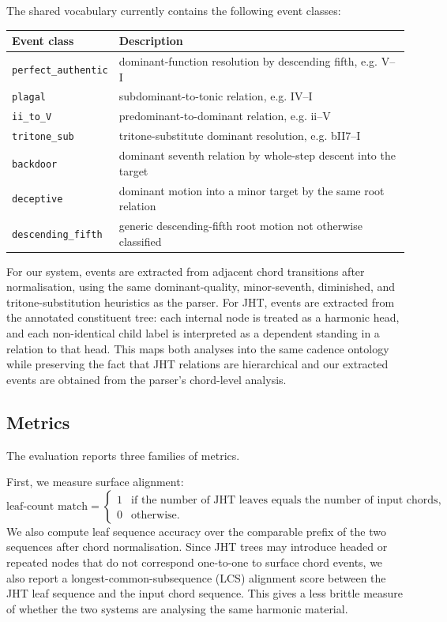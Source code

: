 The shared vocabulary currently contains the following event classes:

\begin{center}
\begin{tabular}{ll}
\hline
Event class & Description \\
\hline
\texttt{perfect\_authentic} & dominant-function resolution by descending fifth, e.g. V--I \\
\texttt{plagal} & subdominant-to-tonic relation, e.g. IV--I \\
\texttt{ii\_to\_V} & predominant-to-dominant relation, e.g. ii--V \\
\texttt{tritone\_sub} & tritone-substitute dominant resolution, e.g. bII7--I \\
\texttt{backdoor} & dominant seventh relation by whole-step descent into the target \\
\texttt{deceptive} & dominant motion into a minor target by the same root relation \\
\texttt{descending\_fifth} & generic descending-fifth root motion not otherwise classified \\
\hline
\end{tabular}
\end{center}

For our system, events are extracted from adjacent chord transitions after
normalisation, using the same dominant-quality, minor-seventh, diminished, and
tritone-substitution heuristics as the parser. For JHT, events are extracted
from the annotated constituent tree: each internal node is treated as a
harmonic head, and each non-identical child label is interpreted as a dependent
standing in a relation to that head. This maps both analyses into the same
cadence ontology while preserving the fact that JHT relations are hierarchical
and our extracted events are obtained from the parser's chord-level analysis.

\subsection{Metrics}

The evaluation reports three families of metrics.

First, we measure surface alignment:
\[
\text{leaf-count match} =
\begin{cases}
1 & \text{if the number of JHT leaves equals the number of input chords},\\
0 & \text{otherwise}.
\end{cases}
\]
We also compute leaf sequence accuracy over the comparable prefix of the two
sequences after chord normalisation. Since JHT trees may introduce headed or
repeated nodes that do not correspond one-to-one to surface chord events, we
also report a longest-common-subsequence (LCS) alignment score between the JHT
leaf sequence and the input chord sequence. This gives a less brittle measure
of whether the two systems are analysing the same harmonic material.

